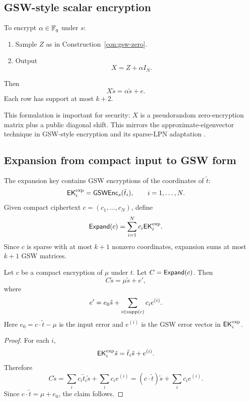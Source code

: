 \subsection{GSW-style scalar encryption}

\begin{construction}
\label{con:gsw-scalar}
To encrypt $\alpha\in\mathbb{F}_q$ under $s$:
\begin{enumerate}
    \item Sample $Z$ as in Construction~\ref{con:gsw-zero}.
    \item Output
    \[
        X=Z+\alpha I_N.
    \]
\end{enumerate}
Then
\[
    X\tilde{s}=\alpha\tilde{s}+e.
\]
Each row has support at most $k+2$.
\end{construction}

This formulation is important for security: $X$ is a pseudorandom zero-encryption matrix plus a public diagonal shift.  This mirrors the approximate-eigenvector technique in GSW-style encryption \cite{GSW2013} and its sparse-LPN adaptation \cite{CorriganGibbsHenzingerKalaiVaikuntanathan2024}.

\subsection{Expansion from compact input to GSW form}

The expansion key contains GSW encryptions of the coordinates of $\tilde{t}$:
\[
    \mathsf{EK}^{\rm exp}_i=\mathsf{GSW}\mathsf{Enc}_s(\tilde{t}_i),
    \qquad i=1,\ldots,N.
\]
Given compact ciphertext $c=(c_1,\ldots,c_N)$, define
\[
    \mathsf{Expand}(c)=\sum_{i=1}^{N}c_i\mathsf{EK}^{\rm exp}_i.
\]
Since $c$ is sparse with at most $k+1$ nonzero coordinates, expansion sums at most $k+1$ GSW matrices.

\begin{lemma}
\label{lem:expansion-identity}
Let $c$ be a compact encryption of $\mu$ under $t$.  Let $C=\mathsf{Expand}(c)$.  Then
\[
    C\tilde{s}=\mu\tilde{s}+e',
\]
where
\[
    e'=e_0\tilde{s}+\sum_{i\in\operatorname{supp}(c)}c_i e^{(i)}.
\]
Here $e_0=c\cdot\tilde{t}-\mu$ is the input error and $e^{(i)}$ is the GSW error vector in $\mathsf{EK}^{\rm exp}_i$.
\end{lemma}

\begin{proof}
For each $i$,
\[
    \mathsf{EK}^{\rm exp}_i\tilde{s}=\tilde{t}_i\tilde{s}+e^{(i)}.
\]
Therefore
\[
    C\tilde{s}
    =\sum_i c_i\tilde{t}_i\tilde{s}+\sum_i c_ie^{(i)}
    =(c\cdot\tilde{t})\tilde{s}+\sum_i c_ie^{(i)}.
\]
Since $c\cdot\tilde{t}=\mu+e_0$, the claim follows.
\end{proof}

